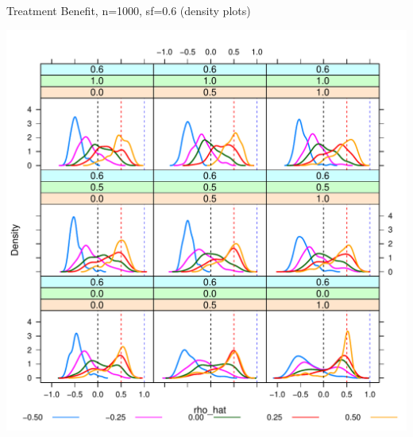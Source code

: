 \begin{frame}{Treatment Benefit, n=1000, sf=0.6 (density plots)}

\begin{center}
  \includegraphics[scale=0.45]{Figure3/tbl3DensityPlots_rho_n1000_003.pdf} %
\end{center}

\end{frame}


